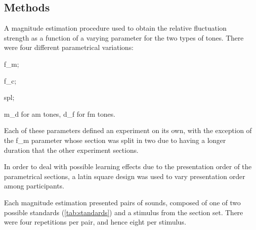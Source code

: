 \documentclass[../main.tex]{subfiles}
\begin{document}
\subsection{Methods}

A magnitude estimation procedure used to obtain the relative fluctuation
strength as a function of a varying parameter for the two types of tones. There
were four different parametrical variations:
\begin{inparaenum}[(1)]
  \item \gls{f_m};
  \item \gls{f_c};
  \item \gls{spl};
  \item \gls{m_d} for \gls{am} tones, \gls{d_f} for \gls{fm} tones.
\end{inparaenum}

Each of these parameters defined an experiment on its own, with the exception of
the \gls{f_m} parameter whose section was split in two due to having a longer
duration that the other experiment sections.

In order to deal with possible learning effects due to the presentation order
of the parametrical sections, a latin square design was used to vary
presentation order among participants.

Each magnitude estimation presented pairs of sounds, composed of one of two
possible standards (\cref{tab:standards}) and a stimulus from the section set.
There were four repetitions per pair, and hence eight per stimulus.
\end{document}
